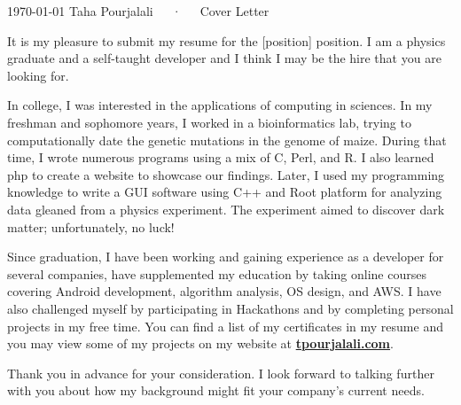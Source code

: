 \documentclass[11pt, a4paper]{awesome-cv}
\begin{document}
\makecvheader

\makecvfooter
  {\today}
  {Taha Pourjalali~~~·~~~Cover Letter}
  {}

\makelettertitle

\begin{cvletter}



It is my pleasure to submit my resume for the [position] position. I am a physics graduate and a self-taught developer and I think I may be the hire that you are looking for.  

In college, I was interested in the applications of computing in sciences.  In my freshman and sophomore years, I worked in a bioinformatics lab, trying to computationally date the genetic mutations in the genome of maize. During that time, I wrote numerous programs using a mix of C, Perl, and R.  I also learned php to create a website to showcase our findings.  
Later, I used my programming knowledge to write a GUI software using C++ and Root platform for analyzing data gleaned from a physics experiment.  The experiment aimed to discover dark matter; unfortunately, no luck!

Since graduation, I have been working and gaining experience as a developer for several companies,  
have supplemented my education by taking online courses covering Android development, algorithm analysis, OS design, and AWS. I have also challenged myself by participating in Hackathons and by completing personal projects in my free time. You can find a list of my certificates in my resume and you may view some of my projects on my website at \textbf{\href{http://www.tpourjalali.com}{tpourjalali.com}}.


Thank you in advance for your consideration.  I look forward to talking further with you about how my background might fit your company's current needs.




\end{cvletter}
\end{document}
